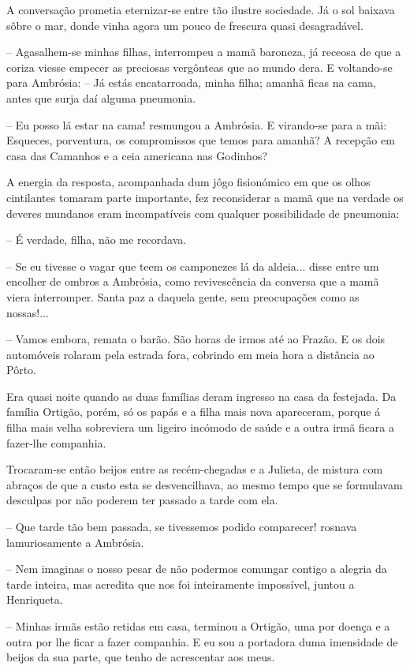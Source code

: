 \documentclass[9pt]{article}
\begin{document}
A conversa\-ção prometia eternizar-se entre tão ilustre sociedade.
Já o sol baixava sôbre o mar, donde vinha agora um pouco de frescura quasi desa\-gra\-dá\-vel.

-- Agasa\-lhem-se minhas fi\-lhas, interrompeu a mamã baroneza, já receosa de que a coriza viesse empecer as preciosas vergônteas que ao mundo
dera. E voltando-se para Ambrósia: -- Já estás encatarroada, minha fi\-lha;
a\-ma\-nhã fi\-cas na cama, antes que surja daí alguma pneumonia.

-- Eu posso lá estar na cama! resmungou a Ambrósia. E viran\-\mbox{do-se} para
a mãi: Esqueces, porventura, os compromissos que temos para a\-ma\-nhã? A
recep\-ção em casa das Camanhos e a ceia americana nas Godinhos?

A energia da resposta, acompanhada dum jôgo fisionómico em que
os o\-lhos cintilantes tomaram parte importante, fez reconsiderar a mamã
que na verdade os deveres mundanos eram incompatíveis com qualquer possibilidade
de pneumonia:

-- É verdade, fi\-lha, não me recordava.

-- Se eu tivesse o vagar que teem os camponezes lá da aldeia...
disse entre um enco\-lher de ombros a Ambrósia, como revivescência da conversa que a mamã viera interromper. Santa paz a daquela gente, sem preocupa\-ções como as nossas!...

-- Vamos embora, remata o barão. São horas de irmos até ao Frazão.
E os dois automóveis rolaram pela estrada fora, cobrindo em meia
hora a distância ao Pôrto.

Era quasi noite quan\-do as duas fa\-mí\-lias deram ingresso na casa da
festejada. Da fa\-mí\-lia Ortigão, porém, só os papás e a fi\-lha mais nova apareceram, porque á fi\-lha mais ve\-lha sobreviera um ligeiro incómodo de saúde e a outra irmã fi\-cara a fazer-\-lhe companhia.

Trocaram-se então beijos entre as recém-chegadas e a Julieta, de
mistura com abraços de que a custo esta se desvenci\-lhava, ao mesmo tempo
que se formulavam desculpas por não poderem ter passado a tarde com ela.

-- Que tarde tão bem passada, se tivessemos podido comparecer!
rosnava lamuriosamente a Ambrósia.

-- Nem imaginas o nosso pesar de não podermos comungar contigo a
alegria da tarde inteira, mas acredita que nos foi inteiramente impossível, juntou a Henriqueta.

-- Minhas irmãs estão retidas em casa, terminou a Ortigão, uma por
doença e a outra por lhe fi\-car a fazer companhia. E eu sou a  portadora
duma imensidade de beijos da sua parte, que tenho de acrescentar aos meus.
\end{document}
